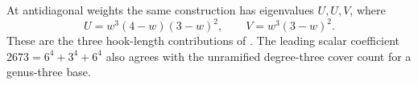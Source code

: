 At antidiagonal weights the same construction has eigenvalues $U,U,V$,
where
\begin{equation}\label{eq:UV}
 U=w^3(4-w)(3-w)^2,\qquad V=w^3(3-w)^2.
\end{equation}
These are the three hook-length contributions of \cite[Corollary~7.3]{BP}. The leading scalar coefficient
$2673=6^4+3^4+6^4$ also agrees with the unramified degree-three
cover count for a genus-three base.
